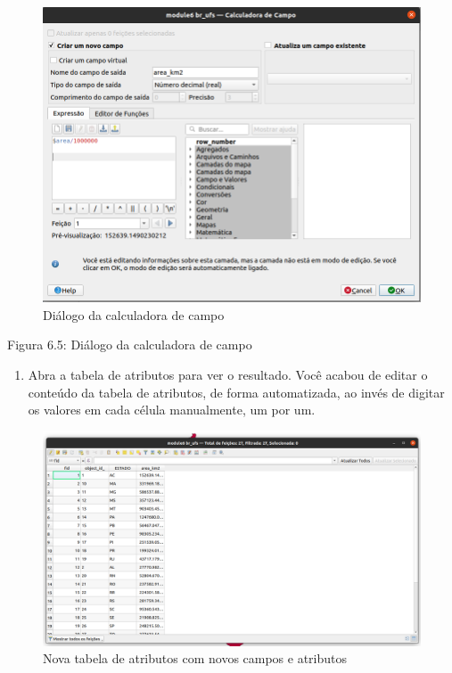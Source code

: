 \documentclass[
]{book}
\providecommand{\tightlist}{%
  \setlength{\itemsep}{0pt}\setlength{\parskip}{0pt}}
\begin{document}
\begin{figure}
\centering
\includegraphics{media/modulo6/fieldcalc.png}
\caption{Diálogo da calculadora de campo}
\end{figure}

Figura 6.5: Diálogo da calculadora de campo

\begin{enumerate}
\def\labelenumi{\arabic{enumi}.}
\setcounter{enumi}{5}
\tightlist
\item
  Abra a tabela de atributos para ver o resultado. Você acabou de editar o conteúdo da tabela de atributos, de forma automatizada, ao invés de digitar os valores em cada célula manualmente, um por um.
\end{enumerate}

\begin{figure}
\centering
\includegraphics{media/modulo6/area.png}
\caption{Nova tabela de atributos com novos campos e atributos}
\end{figure}
\end{document}
